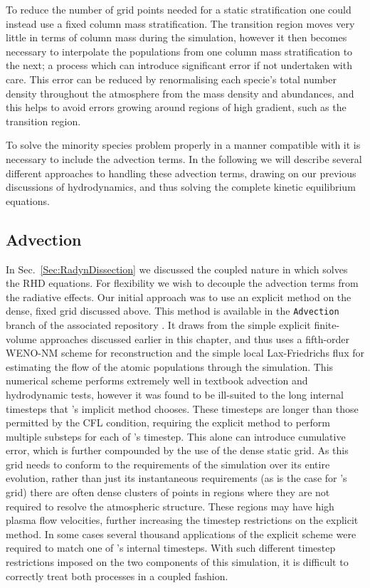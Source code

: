 To reduce the number of grid points needed for a static stratification one could instead use a fixed column mass stratification.
The transition region moves very little in terms of column mass during the simulation, however it then becomes necessary to interpolate the populations from one column mass stratification to the next; a process which can introduce significant error if not undertaken with care.
This error can be reduced by renormalising each specie's total number density throughout the atmosphere from the mass density and abundances, and this helps to avoid errors growing around regions of high gradient, such as the transition region.

To solve the minority species problem properly in a manner compatible with \Radyn{} it is necessary to include the advection terms.
In the following we will describe several different approaches to handling these advection terms, drawing on our previous discussions of hydrodynamics, and thus solving the complete kinetic equilibrium equations.

\subsection{Advection}

In Sec.~\ref{Sec:RadynDissection} we discussed the coupled nature in which \Radyn{} solves the RHD equations.
For flexibility we wish to decouple the advection terms from the radiative effects.
Our initial approach was to use an explicit method on the dense, fixed grid discussed above.
This method is available in the \texttt{Advection} branch of the associated repository \NeedRef{}.
It draws from the simple explicit finite-volume approaches discussed earlier in this chapter, and thus uses a fifth-order WENO-NM scheme for reconstruction and the simple local Lax-Friedrichs flux for estimating the flow of the atomic populations through the simulation.
This numerical scheme performs extremely well in textbook advection and hydrodynamic tests, however it was found to be ill-suited to the long internal timesteps that \Radyn{}'s implicit method chooses.
These timesteps are longer than those permitted by the CFL condition, requiring the explicit method to perform multiple substeps for each of \Radyn{}'s timestep.
This alone can introduce cumulative error, which is further compounded by the use of the dense static grid.
As this grid needs to conform to the requirements of the simulation over its entire evolution, rather than just its instantaneous requirements (as is the case for \Radyn{}'s grid) there are often dense clusters of points in regions where they are not required to resolve the atmospheric structure.
These regions may have high plasma flow velocities, further increasing the timestep restrictions on the explicit method.
In some cases several thousand applications of the explicit scheme were required to match one of \Radyn{}'s internal timesteps.
With such different timestep restrictions imposed on the two components of this simulation, it is difficult to correctly treat both processes in a coupled fashion.

